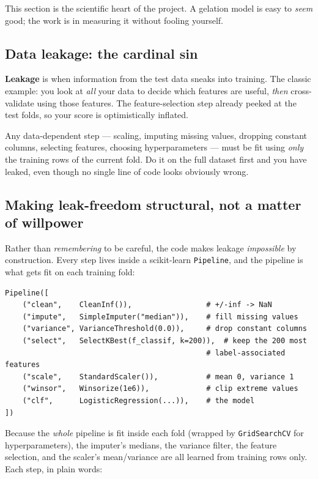 \documentclass[11pt]{article}
\newenvironment{callout}[2][blue]{%
  \par\smallskip\colorlet{shadecolor}{#1!7}%
  \begin{shaded}\noindent{\color{#1!55!black}\bfseries #2.\ }\ignorespaces}%
  {\end{shaded}\smallskip}
\newcommand{\code}[1]{\texttt{#1}}
\begin{document}
This section is the scientific heart of the project. A gelation model is easy to
\emph{seem} good; the work is in measuring it without fooling yourself.

\subsection{Data leakage: the cardinal sin}
\textbf{Leakage} is when information from the test data sneaks into training. The
classic example: you look at \emph{all} your data to decide which features are
useful, \emph{then} cross-validate using those features. The feature-selection
step already peeked at the test folds, so your score is optimistically inflated.

\begin{callout}[red]{Pitfall}
Any data-dependent step --- scaling, imputing missing values, dropping constant
columns, selecting features, choosing hyperparameters --- must be fit using
\emph{only} the training rows of the current fold. Do it on the full dataset
first and you have leaked, even though no single line of code looks obviously
wrong.
\end{callout}

\subsection{Making leak-freedom structural, not a matter of willpower}
Rather than \emph{remembering} to be careful, the code makes leakage
\emph{impossible} by construction. Every step lives inside a scikit-learn
\code{Pipeline}, and the pipeline is what gets fit on each training fold:

\begin{lstlisting}
Pipeline([
    ("clean",    CleanInf()),                 # +/-inf -> NaN
    ("impute",   SimpleImputer("median")),    # fill missing values
    ("variance", VarianceThreshold(0.0)),     # drop constant columns
    ("select",   SelectKBest(f_classif, k=200)),  # keep the 200 most
                                              # label-associated features
    ("scale",    StandardScaler()),           # mean 0, variance 1
    ("winsor",   Winsorize(1e6)),             # clip extreme values
    ("clf",      LogisticRegression(...)),    # the model
])
\end{lstlisting}

Because the \emph{whole} pipeline is fit inside each fold (wrapped by
\code{GridSearchCV} for hyperparameters), the imputer's medians, the variance
filter, the feature selection, and the scaler's mean/variance are all learned from
training rows only. Each step, in plain words:
\end{document}
